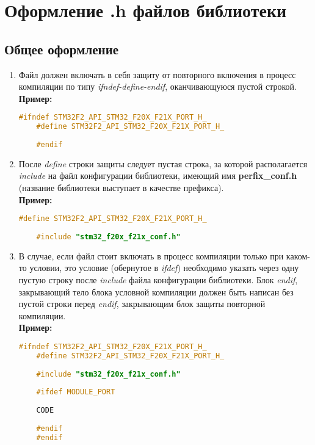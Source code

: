 \section{Оформление .h файлов библиотеки}\label{file:h}
\subsection{Общее оформление}
\begin{enumerate}
	\item Файл должен включать в себя защиту от повторного включения в процесс компиляции по типу \textit{ifndef-define-endif}, оканчивающуюся пустой строкой.\\\textbf{Пример:}\begin{lstlisting}[language=C++, frame=tlBR, basicstyle=\fontsize{8}{8}\ttfamily]
	#ifndef STM32F2_API_STM32_F20X_F21X_PORT_H_
	#define STM32F2_API_STM32_F20X_F21X_PORT_H_
	
	#endif\end{lstlisting}
	
	\item После \textit{define} строки защиты следует пустая строка, за которой располагается \textit{include} на файл конфигурации библиотеки, имеющий имя \textbf{perfix\_conf.h} (название библиотеки выступает в качестве префикса).\\\textbf{Пример:}\begin{lstlisting}[language=C++, frame=tlBR, basicstyle=\fontsize{8}{8}\ttfamily]
	#define STM32F2_API_STM32_F20X_F21X_PORT_H_
	
	#include "stm32_f20x_f21x_conf.h"\end{lstlisting}
	
	\item В случае, если файл стоит включать в процесс компиляции только при каком-то условии, это условие (обернутое в \textit{ifdef}) необходимо указать через одну пустую строку после \textit{include} файла конфигурации библиотеки. Блок \textit{endif}, закрывающий тело блока условной компиляции должен быть написан без пустой строки перед \textit{endif}, закрывающим блок защиты повторной компиляции.\\\textbf{Пример:}\begin{lstlisting}[language=C++, frame=tlBR, basicstyle=\fontsize{8}{8}\ttfamily]
	#ifndef STM32F2_API_STM32_F20X_F21X_PORT_H_
	#define STM32F2_API_STM32_F20X_F21X_PORT_H_
	
	#include "stm32_f20x_f21x_conf.h"
	
	#ifdef MODULE_PORT
	
	CODE
	
	#endif
	#endif\end{lstlisting}
\end{enumerate}